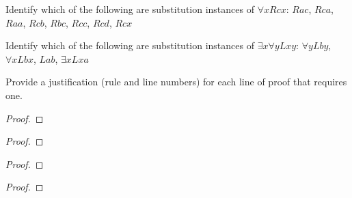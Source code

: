 \solutions
\problempart
\label{pr.subinstanceQL}
\begin{earg}
\item Identify which of the following are substitution instances of $\forall x Rcx$: $Rac$, $Rca$, $Raa$, $Rcb$, $Rbc$, $Rcc$, $Rcd$, $Rcx$
\item Identify which of the following are substitution instances of $\exists x\forall y Lxy$:
$\forall y Lby$, $\forall x Lbx$, $Lab$, $\exists x Lxa$
\end{earg}



\newpage
\solutions
\problempart
\label{pr.justifyQLproof}
Provide a justification (rule and line numbers) for each line of proof that requires one.
\begin{multicols}{2}
\begin{proof}
	\open
	\close
{} {}
\end{proof}

\begin{proof}
 {}
 {}
\end{proof}


\begin{proof}
\open
\close
{}
\end{proof}





\begin{proof}
	\open
	\close
{} {}
\end{proof}
\end{multicols}

